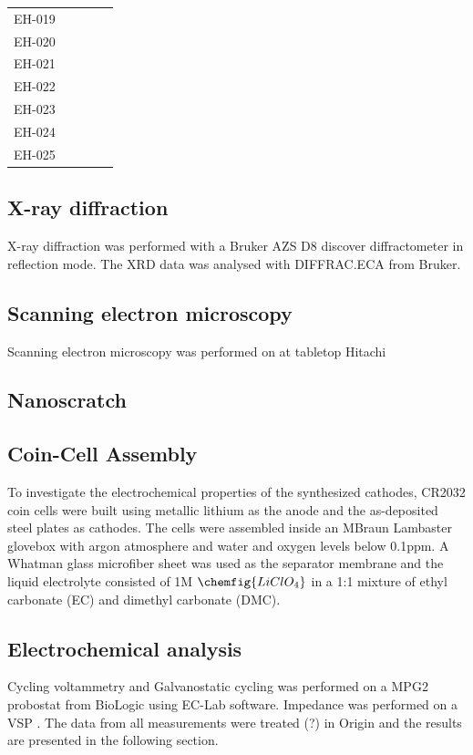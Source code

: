 \documentclass[Main/main.tex]{subfiles}
\begin{document}
\begin{tabular}{ccccc}
	EH-019 &  &  &  &  \\ 
	
	EH-020 &  &  &  &  \\ 
	
	EH-021 &  &  &  &  \\ 
	
	EH-022 &  &  &  &  \\ 
	
	EH-023 &  &  &  &  \\ 
	
	EH-024&  &  &  &  \\ 
	
	EH-025&  &  &  &  \\ 
	\hline 
\end{tabular} 

\subsection{X-ray diffraction}
X-ray diffraction was performed with a Bruker AZS D8 discover diffractometer in reflection mode. The XRD data was analysed with DIFFRAC.ECA from Bruker.

\subsection{Scanning electron microscopy}
Scanning electron microscopy was performed on at tabletop Hitachi 

\subsection{Nanoscratch}


\subsection{Coin-Cell Assembly}
To investigate the electrochemical properties of the synthesized cathodes, CR2032 coin cells were built using metallic lithium as the anode and the as-deposited steel plates as cathodes. The cells were assembled inside an MBraun Lambaster glovebox with argon atmosphere and water and oxygen levels below 0.1ppm. A Whatman glass microfiber sheet was used as the separator membrane and the liquid electrolyte consisted of 1M $\chemfig{LiClO_4}$ in a 1:1 mixture of ethyl carbonate (EC) and dimethyl carbonate (DMC).

\subsection{Electrochemical analysis}
Cycling voltammetry and Galvanostatic cycling was performed on a MPG2 probostat from BioLogic using EC-Lab software. Impedance was performed on a VSP . The data from all measurements were treated (?) in Origin and the results are presented in the following section.
\end{document}
